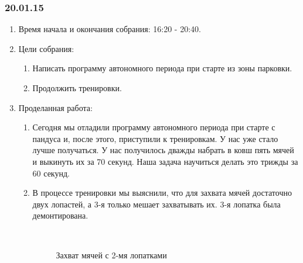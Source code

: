 \subsubsection{20.01.15}
\begin{enumerate}
	
	\item Время начала и окончания собрания: 16:20 - 20:40.
	
	\item Цели собрания: 
	\begin{enumerate}
		
		\item Написать программу автономного периода при старте из зоны парковки.
		
		\item Продолжить тренировки.
		
	\end{enumerate}

	\item Проделанная работа:
	\begin{enumerate}
		
		\item Сегодня мы отладили программу автономного периода при старте с пандуса и, после этого, приступили к тренировкам. У нас уже стало лучше получаться. У нас получилось дважды набрать в ковш пять мячей и выкинуть их за 70 секунд. Наша задача научиться делать это трижды за 60 секунд.
		
		\item В процессе тренировки мы выяснили, что для захвата мячей достаточно двух лопастей, а 3-я только мешает захватывать их. 3-я лопатка была демонтирована.
        \begin{figure}[H]
	  	  \begin{minipage}[h]{0.2\linewidth}
	  	    \center  
	  	  \end{minipage}
	  	  \begin{minipage}[h]{0.6\linewidth}
	  		\caption{Захват мячей с 2-мя лопатками}
	  	  \end{minipage}
	   \end{figure}


\end{enumerate}
\end{enumerate}
